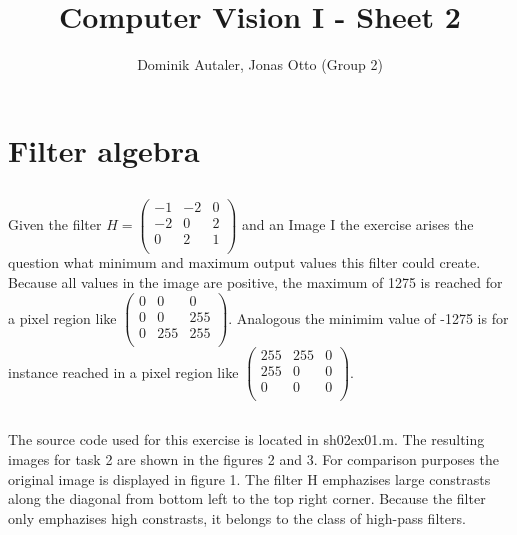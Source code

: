 \documentclass[12pt,a4paper]{article}
\begin{document}
\setlength{\parindent}{0pt}


\title{Computer Vision I - Sheet 2}
\author{Dominik Autaler, Jonas Otto (Group 2)}

\maketitle
\newpage

\section{Filter algebra}

\subsection{}
Given the filter $H = \left(\begin{array}{rrr}-1 & -2 & 0\\-2 & 0 & 2\\0 & 2 & 1\\\end{array}\right) $ and an Image I \in [0, 255] the exercise arises the question what minimum and maximum output values this filter could create. Because all values in the image are positive, the maximum of 1275 is reached for a pixel region like $\left(\begin{array}{rrr}0 & 0 & 0\\0 & 0 & 255\\0 & 255 & 255\\\end{array}\right) $. Analogous the minimim value of -1275 is for instance reached in a pixel region like $\left(\begin{array}{rrr}255 & 255 & 0\\255 & 0 & 0\\0 & 0 & 0\\\end{array}\right)$.

\subsection{}
The source code used for this exercise is located in sh02ex01.m. The resulting images for task 2 are shown in the figures 2 and 3. For comparison purposes the original image is displayed in figure 1. The filter H emphazises large constrasts along the diagonal from bottom left to the top right corner. Because the filter only emphazises high constrasts, it belongs to the class of high-pass filters.
 
\end{document}
